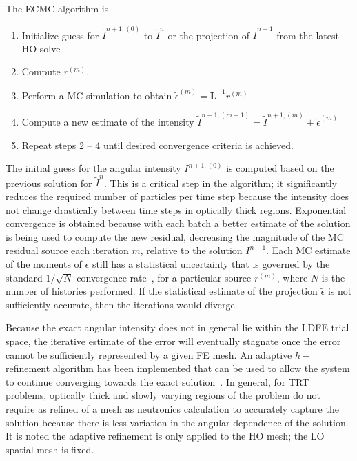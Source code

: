 \documentclass[11pt]{article}
\newcommand{\B}[1]{\ensuremath{\mathbf{#1}}}
\begin{document}
The ECMC algorithm is
\begin{enumerate}
    \item Initialize guess for $\tilde{I}^{n+1,(0)}$ to $\tilde{I}^{n}$ or the
        projection of $\tilde{I}^{n+1}$ from the latest HO solve
\item Compute $r^{(m)}$.
\item Perform a MC simulation to obtain $\tilde{\epsilon}^{(m)} = \B L^{-1} r^{(m)}$
\item Compute a new estimate of the intensity $\tilde I^{n+1,(m+1)} = \tilde I^{n+1,(m)}
+ \tilde\epsilon^{(m)}$
\item Repeat steps 2 -- 4 until desired convergence criteria is achieved. 
\end{enumerate}
The initial guess for the angular intensity $I^{n+1,(0)}$ is computed based on the previous solution
for $\tilde{I}^{n}$. This is a critical step in the algorithm; it significantly reduces the required number of
particles per time step because the intensity does not change drastically between time steps in
optically thick regions.  
Exponential convergence is obtained because with each batch a
better estimate of the solution is being used to compute the new residual, decreasing
the magnitude of the MC residual source each iteration $m$, relative to the solution
$I^{n+1}$.  Each MC
estimate of the moments of $\epsilon$ still has a statistical uncertainty that is
governed by the standard $1/\sqrt{N}$ convergence rate~\cite{shultis_mc}, for a
particular source $r^{(m)}$, where $N$ is the number of histories performed.  If the statistical estimate of the projection $\tilde\epsilon$ is not sufficiently
accurate, then the iterations would diverge.  

Because the exact angular intensity does not in general lie within the LDFE trial space, the
iterative estimate of the error will eventually stagnate once the error cannot be sufficiently
represented by a given FE mesh.  An adaptive $h-$refinement algorithm has been
implemented that can be used to allow the system to continue converging towards the
exact solution~\cite{jake,ans_2014}. In general, for TRT problems, optically thick and slowly varying
regions of the problem do not require as refined of a mesh as neutronics calculation to accurately capture the
solution because there is less variation in the angular dependence of the solution.
It is noted the adaptive refinement is only applied to the HO mesh; the LO spatial
mesh is fixed.
\end{document}
